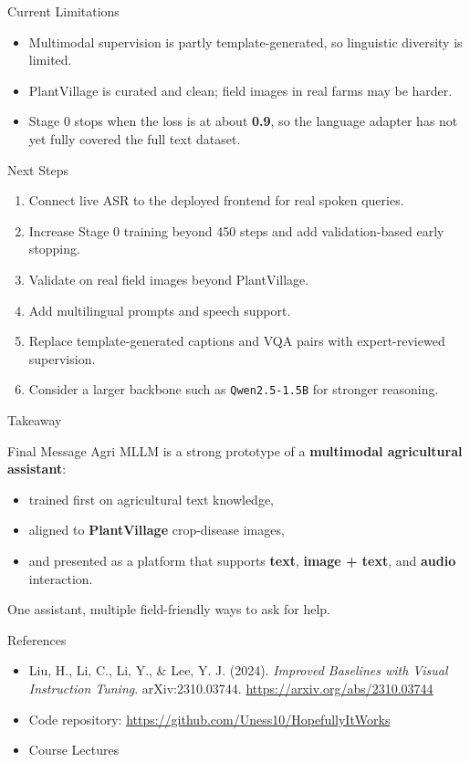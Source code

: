 \documentclass[aspectratio=169,11pt]{beamer}
\begin{document}
\begin{frame}{Current Limitations}
\begin{itemize}
    \item Multimodal supervision is partly template-generated, so linguistic diversity is limited.
    \item PlantVillage is curated and clean; field images in real farms may be harder.
    \item Stage 0 stops when the loss is at about \textbf{0.9}, so the language adapter has not yet fully covered the full text dataset.
    

\end{itemize}
\end{frame}

\begin{frame}{Next Steps}
\begin{enumerate}
    \item Connect live ASR to the deployed frontend for real spoken queries.
    \item Increase Stage 0 training beyond 450 steps and add validation-based early stopping.
    \item Validate on real field images beyond PlantVillage.
    \item Add multilingual prompts and speech support.
    \item Replace template-generated captions and VQA pairs with expert-reviewed supervision.
    \item Consider a larger backbone such as \texttt{Qwen2.5-1.5B} for stronger reasoning.
\end{enumerate}
\end{frame}

\begin{frame}{Takeaway}
\begin{block}{Final Message}
Agri MLLM is a strong prototype of a \textbf{multimodal agricultural assistant}:
\begin{itemize}
    \item trained first on agricultural text knowledge,
    \item aligned to \textbf{PlantVillage} crop-disease images,
    \item and presented as a platform that supports \textbf{text}, \textbf{image + text}, and \textbf{audio} interaction.
\end{itemize}
\end{block}
\vspace{0.5em}
\centering
\Large\textcolor{AgroGreen}{One assistant, multiple field-friendly ways to ask for help.}
\end{frame}
\begin{frame}{References}
\begin{itemize}
    \item Liu, H., Li, C., Li, Y., \& Lee, Y. J. (2024).  
    \textit{Improved Baselines with Visual Instruction Tuning}.  
    arXiv:2310.03744.  
    \url{https://arxiv.org/abs/2310.03744}
    
    \item Code repository:  
    \url{https://github.com/Uness10/HopefullyItWorks}
    \item Course Lectures
\end{itemize}
\end{frame}
\end{document}
